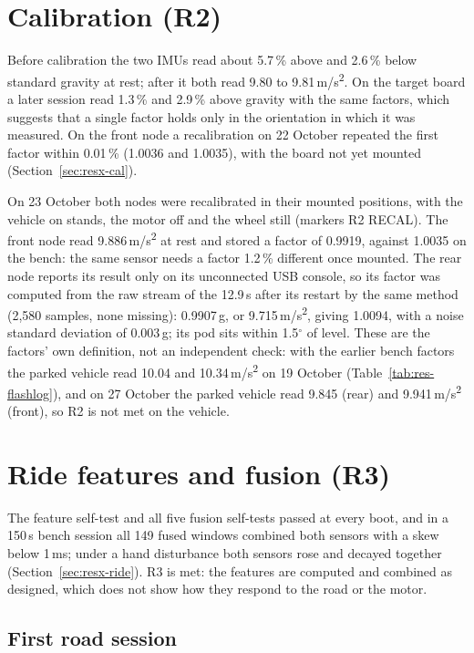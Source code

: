 \section{Calibration (R2)}
\label{sec:res-cal}

Before calibration the two IMUs read about 5.7\,\% above and 2.6\,\% below standard gravity at rest; after it both read 9.80 to 9.81\,m/s\textsuperscript{2}. On the target board a later session read 1.3\,\% and 2.9\,\% above gravity with the same factors, which suggests that a single factor holds only in the orientation in which it was measured. On the front node a recalibration on 22 October repeated the first factor within 0.01\,\% (1.0036 and 1.0035), with the board not yet mounted (Section~\ref{sec:resx-cal}).

On 23 October both nodes were recalibrated in their mounted positions, with the vehicle on stands, the motor off and the wheel still (markers R2 RECAL). The front node read 9.886\,m/s\textsuperscript{2} at rest and stored a factor of 0.9919, against 1.0035 on the bench: the same sensor needs a factor 1.2\,\% different once mounted. The rear node reports its result only on its unconnected USB console, so its factor was computed from the raw stream of the 12.9\,s after its restart by the same method (2,580 samples, none missing): 0.9907\,g, or 9.715\,m/s\textsuperscript{2}, giving 1.0094, with a noise standard deviation of 0.003\,g; its pod sits within 1.5$^\circ$ of level. These are the factors' own definition, not an independent check: with the earlier bench factors the parked vehicle read 10.04 and 10.34\,m/s\textsuperscript{2} on 19 October (Table~\ref{tab:res-flashlog}), and on 27 October the parked vehicle read 9.845 (rear) and 9.941\,m/s\textsuperscript{2} (front), so R2 is not met on the vehicle.

\section{Ride features and fusion (R3)}
\label{sec:res-ride}

The feature self-test and all five fusion self-tests passed at every boot, and in a 150\,s bench session all 149 fused windows combined both sensors with a skew below 1\,ms; under a hand disturbance both sensors rose and decayed together (Section~\ref{sec:resx-ride}). R3 is met: the features are computed and combined as designed, which does not show how they respond to the road or the motor.

\subsection{First road session}
\label{sec:res-road1}


